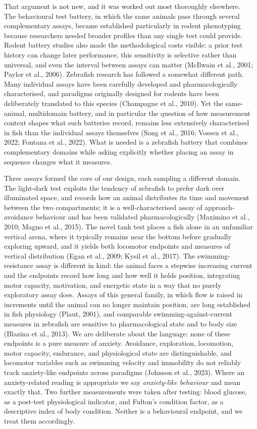 \documentclass[12pt,a4paper]{article}
\begin{document}
That argument is not new, and it was worked out most thoroughly elsewhere. The behavioural test battery, in which the same animals pass through several complementary assays, became established particularly in rodent phenotyping because researchers needed broader profiles than any single test could provide. Rodent battery studies also made the methodological costs visible: a prior test history can change later performance, this sensitivity is selective rather than universal, and even the interval between assays can matter (McIlwain et al., 2001; Paylor et al., 2006). Zebrafish research has followed a somewhat different path. Many individual assays have been carefully developed and pharmacologically characterised, and paradigms originally designed for rodents have been deliberately translated to this species (Champagne et al., 2010). Yet the same-animal, multidomain battery, and in particular the question of how measurement context shapes what such batteries record, remains less extensively characterised in fish than the individual assays themselves (Song et al., 2016; Vossen et al., 2022; Fontana et al., 2022). What is needed is a zebrafish battery that combines complementary domains while asking explicitly whether placing an assay in sequence changes what it measures.

Three assays formed the core of our design, each sampling a different domain. The light-dark test exploits the tendency of zebrafish to prefer dark over illuminated space, and records how an animal distributes its time and movement between the two compartments; it is a well-characterised assay of approach-avoidance behaviour and has been validated pharmacologically (Maximino et al., 2010; Magno et al., 2015). The novel tank test places a fish alone in an unfamiliar vertical arena, where it typically remains near the bottom before gradually exploring upward, and it yields both locomotor endpoints and measures of vertical distribution (Egan et al., 2009; Kysil et al., 2017). The swimming-resistance assay is different in kind: the animal faces a stepwise increasing current and the endpoints record how long and how well it holds position, integrating motor capacity, motivation, and energetic state in a way that no purely exploratory assay does. Assays of this general family, in which flow is raised in increments until the animal can no longer maintain position, are long established in fish physiology (Plaut, 2001), and comparable swimming-against-current measures in zebrafish are sensitive to pharmacological state and to body size (Blazina et al., 2013). We are deliberate about the language: none of these endpoints is a pure measure of anxiety. Avoidance, exploration, locomotion, motor capacity, endurance, and physiological state are distinguishable, and locomotor variables such as swimming velocity and immobility do not reliably track anxiety-like endpoints across paradigms (Johnson et al., 2023). Where an anxiety-related reading is appropriate we say \textit{anxiety-like behaviour} and mean exactly that. Two further measurements were taken after testing: blood glucose, as a post-test physiological indicator, and Fulton's condition factor, as a descriptive index of body condition. Neither is a behavioural endpoint, and we treat them accordingly.
\end{document}
